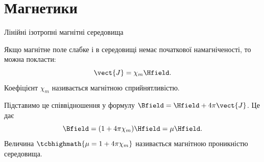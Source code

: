 \documentclass[onlytextwidth]{beamer}
\begin{document}
\section{Магнетики}





\begin{frame}{Лінійні ізотропні магнітні середовища}{}
	\begin{block}{}\justifying
		Якщо магнітне поле слабке і в середовищі немає початкової намагніченості, то можна покласти:
		\begin{equation*}
			\vect{J} = \chi_m\Hfield.
		\end{equation*}
		Коефіцієнт $ \chi_m$ називається \alert{магнітною сприйнятливістю}.

		Підставимо це співвідношення у формулу $\Bfield = \Hfield + 4\pi\vect{J}$. Це дає
		\begin{equation*}
			\Bfield = (1+4\pi\chi_m)\Hfield = \mu\Hfield.
		\end{equation*}
		Величина $\tcbhighmath{\mu = 1+4\pi\chi_m}$ називається \alert{магнітною проникністю середовища}.
	\end{block}
\end{frame}
\end{document}
